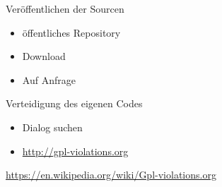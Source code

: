 \begin{frame}{Veröffentlichen der Sourcen}
	\begin{itemize}
		\item öffentliches Repository
		\item Download
		\item Auf Anfrage
	\end{itemize}
\end{frame}

\begin{frame}{Verteidigung des eigenen Codes}
	\begin{itemize}
		\item Dialog suchen
		\item \url{http://gpl-violations.org}
	\end{itemize}
\end{frame}
\note
{
  \url{https://en.wikipedia.org/wiki/Gpl-violations.org}
}